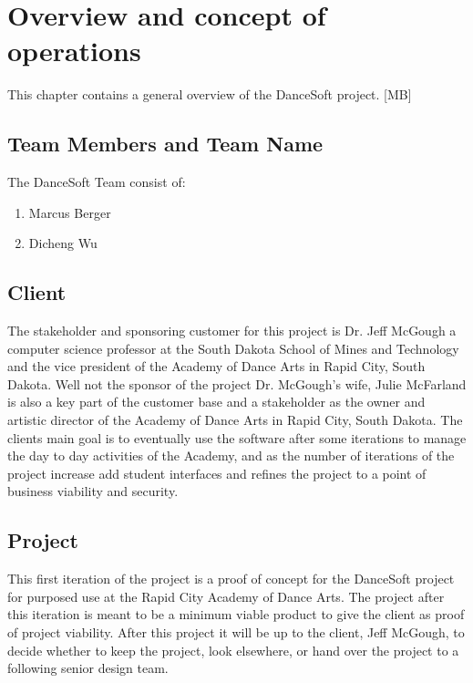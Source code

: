 

\chapter{Overview and concept of operations}

This chapter contains a  general overview of the DanceSoft project. [MB]

\section{Team Members and Team Name}

The DanceSoft Team consist of:
\begin{enumerate}
\item Marcus Berger
\item Dicheng Wu
\end{enumerate}


\section{Client}
The stakeholder and sponsoring customer for this project is Dr. Jeff McGough a computer science professor at the South Dakota School of Mines and Technology and the vice president of the Academy of Dance Arts in Rapid City, South Dakota.
Well not the sponsor of the project Dr. McGough's wife, Julie McFarland is also a key part of the customer base and a stakeholder as the owner and artistic director of the Academy of Dance Arts in Rapid City, South Dakota. The clients main goal is to eventually use the software after some iterations to manage the day to day activities of the Academy, and as the number of iterations of the project increase add student interfaces and refines the project to a point of business viability and security. 



\section{Project}
This first iteration of the project is a proof of concept for the DanceSoft project for purposed use at the Rapid City Academy of Dance Arts. The project after this iteration is meant to be a minimum viable product to give the client as proof of project viability. After this project it will be up to the client, Jeff McGough, to decide whether to keep the project, look elsewhere, or hand over the project to a following senior design team.

